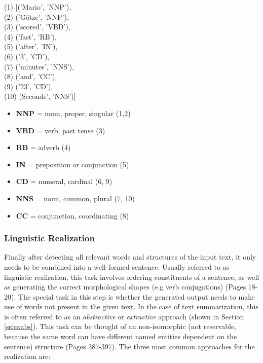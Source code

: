 \begin{tcolorbox}
	\begin{flushleft}
		(1) [('Mario', 'NNP'), \\
		(2) ('Götze', 'NNP'), \\
		(3) ('scored', 'VBD'),\\
		(4) ('fast', 'RB'),\\
		(5) ('after', 'IN'),\\
		(6) ('3', 'CD'),\\
		(7) ('minutes', 'NNS'), \\
		(8) ('and', 'CC'),\\
		(9) ('23', 'CD'),\\
		(10) (Seconds', 'NNS')]
	\end{flushleft}

	\begin{itemize}
		\item \textbf{NNP} = noun, proper, singular (1,2)
		\item \textbf{VBD} = verb, past tense (3)
		\item \textbf{RB} = adverb (4)
		\item \textbf{IN} = preposition or conjunction (5)
		\item \textbf{CD} = numeral, cardinal (6, 9)
		\item \textbf{NNS} = noun, common, plural (7, 10)
		\item \textbf{CC} = conjunction, coordinating (8)
	\end{itemize}
\end{tcolorbox}
\subsubsection{Linguistic Realization}

Finally after detecting all relevant words and structures of the input text, it only needs to be combined into a well-formed sentence. Usually referred to as linguistic realisation, this task involves ordering constituents of a sentence, as well as generating the correct morphological shapes (e.g verb conjugations) \cite{gatt} (Pages 18-20). The special task in this step is whether the generated output needs to make use of words not present in the given text. In the case of text summarization, this is often referred to as an \textit{abstractive} or \textit{extractive} approach (shown in Section \ref{ss:exabs}). This task can be thought of an non-isomorphic (not reservable, because the same word can have different named entities dependent on the sentence) structure \cite{ballesteros-etal-2015-data} (Pages 387-397). The three most common approaches for the realization are:

